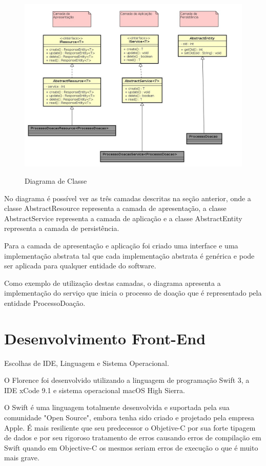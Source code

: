 \documentclass[portuguese,oneside]{tcc}
\begin{document}
\begin{figure}[htp]
\centering
\caption{Diagrama de Classe}
\includegraphics[scale=0.44]{class-diagram}
\label{fig:erDiagram}
\end{figure}

No diagrama é possível ver as três camadas descritas na seção anterior, onde a classe AbstractResource representa a camada de apresentação, a classe AbstractService representa a camada de aplicação e a classe AbstractEntity representa a camada de persistência.

Para a camada de apresentação e aplicação foi criado uma interface e uma implementação abstrata tal que cada implementação abstrata é genérica e pode ser aplicada para qualquer entidade do software.

Como exemplo de utilização destas camadas, o diagrama apresenta a implementação do serviço que inicia o processo de doação que é representado pela entidade ProcessoDoação.

\section{Desenvolvimento Front-End}
Escolhas de IDE, Linguagem e Sistema Operacional.

O Florence foi desenvolvido utilizando a linguagem de programação Swift 3, a IDE xCode 9.1 e sistema operacional macOS High Sierra.

O Swift é uma linguagem totalmente desenvolvida e suportada pela sua comunidade "Open Source", embora tenha sido criado e projetado pela empresa Apple. É mais resiliente que seu predecessor o Objetive-C por sua forte tipagem de dados e por seu rigoroso tratamento de erros causando erros de compilação em Swift quando em Objective-C os mesmos seriam erros de execução o que é muito mais grave.
\end{document}
